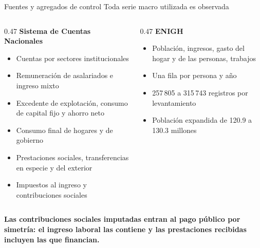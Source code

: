 \documentclass[aspectratio=169,11pt]{beamer}
\newcommand{\bajada}[1]{{\small\textcolor{gris}{#1}}\vspace{0.5em}}
\newcommand{\cierre}[1]{%
  \vfill{\small\textcolor{acento}{\textbf{#1}}}}
\begin{document}
\begin{frame}{Fuentes y agregados de control}
\bajada{Toda serie macro utilizada es observada}

\begin{columns}[T]
\begin{column}{0.47\textwidth}
\textcolor{verde}{\textbf{Sistema de Cuentas Nacionales}}
\begin{itemize}\small\itemsep0.35em
  \item Cuentas por sectores institucionales
  \item Remuneración de asalariados e ingreso mixto
  \item Excedente de explotación, consumo de capital fijo y ahorro neto
  \item Consumo final de hogares y de gobierno
  \item Prestaciones sociales, transferencias en especie y del exterior
  \item Impuestos al ingreso y contribuciones sociales
\end{itemize}
\end{column}
\begin{column}{0.47\textwidth}
\textcolor{acento}{\textbf{ENIGH}}
\begin{itemize}\small\itemsep0.35em
  \item Población, ingresos, gasto del hogar y de las personas, trabajos
  \item Una fila por persona y año
  \item 257\,805 a 315\,743 registros por levantamiento
  \item Población expandida de 120.9 a 130.3 millones
\end{itemize}
\end{column}
\end{columns}

\cierre{Las contribuciones sociales imputadas entran al pago público por simetría: el ingreso
laboral las contiene y las prestaciones recibidas incluyen las que financian.}
\end{frame}
\end{document}
